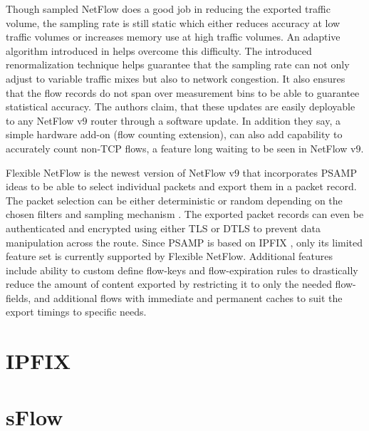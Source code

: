 Though sampled NetFlow does a good job in reducing the exported traffic volume, the sampling rate is still static which either reduces accuracy at low traffic volumes or increases memory use at high traffic volumes. An adaptive algorithm introduced in \cite{cestan:2004} helps overcome this difficulty. The introduced renormalization technique helps guarantee that the sampling rate can not only adjust to variable traffic mixes but also to network congestion. It also ensures that the flow records do not span over measurement bins to be able to guarantee statistical accuracy. The authors claim, that  these updates are easily deployable to any NetFlow v$9$ router through a software update. In addition they say, a simple hardware add-on (flow counting extension), can also add capability to accurately count non-\ac{TCP} flows, a feature long waiting to be seen in NetFlow v$9$.

Flexible NetFlow is the newest version of NetFlow v$9$ that incorporates \ac{PSAMP} \cite{rfc5474} ideas to be able to select individual packets and export them in a packet record. The packet selection can be either deterministic or random depending on the chosen filters and sampling mechanism \cite{rfc5475}. The exported packet records can even be authenticated and encrypted using either \ac{TLS} \cite{rfc5246} or \ac{DTLS} \cite{rfc4347}  to prevent data manipulation across the route. Since \ac{PSAMP} is based on \ac{IPFIX} \cite{rfc5476}, only its limited feature set is currently supported by Flexible NetFlow. Additional features include ability to custom define flow-keys and flow-expiration rules to drastically reduce the amount of content exported by restricting it to only the needed flow-fields, and additional flows with immediate and permanent caches to suit the export timings to specific needs.


\section{IPFIX}\label{sec:ipfix}
\section{sFlow}\label{sec:sflow}